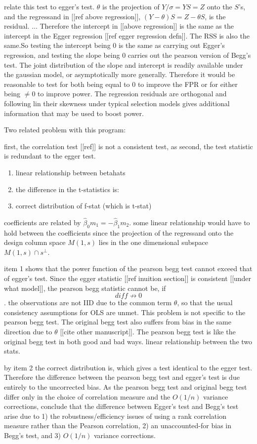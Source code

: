 \documentclass{article}
\newcommand{\gm}{\theta}
\newcommand{\y}{Y}
\newcommand{\z}{Z}
\newcommand{\s}{S}
\begin{document}
relate this test to egger's test. $\gm$ is the projection of
$\y/\sigma=\y\s=\z$ onto the $\s$'s, and the regressand in [[ref above
regression]], $(\y-\gm)\s=\z-\gm\s$, is the residual. ... Therefore
the intercept in [[above regression]] is the same as the intercept in
the Egger regression [[ref egger regression defn]]. The RSS is also
the same.So testing the intercept being $0$ is the same as carrying
out Egger's regression, and testing the slope being $0$ carries out
the pearson version of Begg's test. The joint distribution of the
slope and intercept is readily available under the gaussian model, or
asymptotically more generally. Therefore it would be reasonable to
test for both being equal to $0$ to improve the FPR or for either
being $\neq 0$ to improve power. The regression residuals are
orthogonal and following lin their skewness under typical selection
models gives additional information that may be used to boost power.

Two related problem with this program:

first, the correlation test [[ref]] is not a consistent test, as 
second, the test statistic is redundant to the egger test.

\begin{enumerate}
\item linear relationship between betahats
\item the difference in the t-statistics is:
\item correct distribution of f-stat (which is t-stat)
\end{enumerate}

coefficients are related by $\hat\beta_0 m_1 = -\hat\beta_1 m_2$. some
linear relationship would have to hold between the coefficients since
the projection of the regressand onto the design column space $M(1,s)$
lies in the one dimensional subspace $M(1,s)\cap s^\perp$.

item 1 shows that the power function of the pearson begg test cannot
exceed that of egger's test. Since the egger statistic [[ref inuition
section]] is consistent [[under what model]], the pearson begg
statistic cannot be, if $$diff\not\to 0$$. the observations are not
IID due to the common term $\gm$, so that the usual consistency
assumptions for OLS are unmet. This problem is not specific to the
pearson begg test. The original begg test also suffers from bias in
the same direction due to $\gm$ [[cite other manuscript]]. The pearson
begg test is like the original begg test in both good and bad ways.
linear relationship between the two stats.

by item 2 the correct distribution is, which gives a test identical to
the egger test. Therefore the difference between the pearson begg test
and egger's test is due entirely to the uncorrected bias. As the
pearson begg test and original begg test differ only in the choice of
correlation measure and the $O(1/n)$ variance corrections, conclude
that the difference between Egger's test and Begg's test arise due to
1) the robustness/efficiency issues of using a rank correlation
measure rather than the Pearson correlation, 2) an unaccounted-for
bias in Begg's test, and 3) $O(1/n)$ variance corrections.
\end{document}
